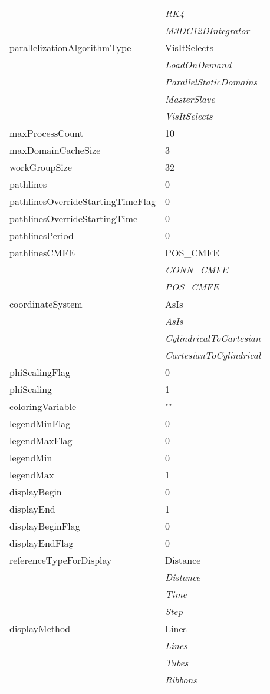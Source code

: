 \documentclass[10pt,a4paper]{report}
\begin{document}
\begin{longtable}{ll}
 & {\it  RK4} \\
 & {\it  M3DC12DIntegrator} \\
parallelizationAlgorithmType  &  VisItSelects   \\
 & {\it  LoadOnDemand} \\
 & {\it  ParallelStaticDomains} \\
 & {\it  MasterSlave} \\
 & {\it  VisItSelects} \\
maxProcessCount  &  10 \\
maxDomainCacheSize  &  3 \\
workGroupSize  &  32 \\
pathlines  &  0 \\
pathlinesOverrideStartingTimeFlag  &  0 \\
pathlinesOverrideStartingTime  &  0 \\
pathlinesPeriod  &  0 \\
pathlinesCMFE  &  POS\_CMFE   \\
 & {\it  CONN\_CMFE} \\
 & {\it  POS\_CMFE} \\
coordinateSystem  &  AsIs   \\
 & {\it  AsIs} \\
 & {\it  CylindricalToCartesian} \\
 & {\it  CartesianToCylindrical} \\
phiScalingFlag  &  0 \\
phiScaling  &  1 \\
coloringVariable  &  "" \\
legendMinFlag  &  0 \\
legendMaxFlag  &  0 \\
legendMin  &  0 \\
legendMax  &  1 \\
displayBegin  &  0 \\
displayEnd  &  1 \\
displayBeginFlag  &  0 \\
displayEndFlag  &  0 \\
referenceTypeForDisplay  &  Distance   \\
 & {\it  Distance} \\
 & {\it  Time} \\
 & {\it  Step} \\
displayMethod  &  Lines   \\
 & {\it  Lines} \\
 & {\it  Tubes} \\
 & {\it  Ribbons} \\

\end{longtable}
\end{document}
